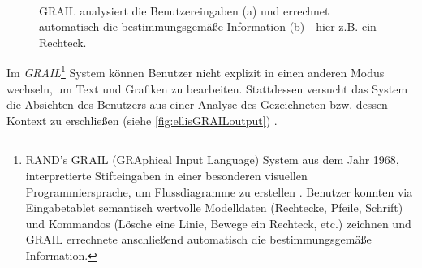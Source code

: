 \begin{figure}
        \myfloatalign
         \quad
         \\
        \caption[GRAIL Funktionalität]{GRAIL analysiert die Benutzereingaben (a) und errechnet automatisch die bestimmungsgemäße Information (b) - hier z.B. ein Rechteck.}\label{fig:ellisGRAILoutput}
\end{figure}

\medskip Im \emph{GRAIL}\footnote{RAND's GRAIL (GRAphical Input Language) System aus dem Jahr 1968, interpretierte Stifteingaben in einer besonderen visuellen Programmiersprache, um Flussdiagramme zu erstellen \citep{Ellis:1969}. Benutzer konnten via Eingabetablet semantisch wertvolle Modelldaten (Rechtecke, Pfeile, Schrift) und Kommandos (Lösche eine Linie, Bewege ein Rechteck, etc.) zeichnen und GRAIL errechnete anschließend automatisch die bestimmungsgemäße Information.} System können Benutzer nicht explizit in einen anderen Modus wechseln, um Text und Grafiken zu bearbeiten. Stattdessen versucht das System die Absichten des Benutzers aus einer Analyse des Gezeichneten bzw. dessen Kontext zu erschließen (siehe \autoref{fig:ellisGRAILoutput}) \citep{Ellis:1969}. 

